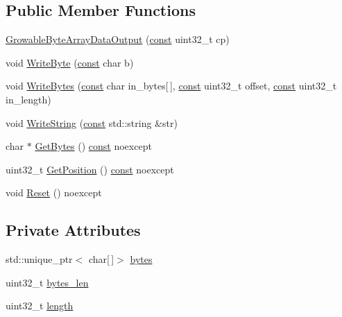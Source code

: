 \subsection*{Public Member Functions}
\begin{DoxyCompactItemize}
\item 
\mbox{\hyperlink{classlucene_1_1core_1_1store_1_1GrowableByteArrayDataOutput_abc6d88640442e04cffc1724dc4762640}{Growable\+Byte\+Array\+Data\+Output}} (\mbox{\hyperlink{ZlibCrc32_8h_a2c212835823e3c54a8ab6d95c652660e}{const}} uint32\+\_\+t cp)
\item 
void \mbox{\hyperlink{classlucene_1_1core_1_1store_1_1GrowableByteArrayDataOutput_acc15bef7c843270e142e935348fa5583}{Write\+Byte}} (\mbox{\hyperlink{ZlibCrc32_8h_a2c212835823e3c54a8ab6d95c652660e}{const}} char b)
\item 
void \mbox{\hyperlink{classlucene_1_1core_1_1store_1_1GrowableByteArrayDataOutput_ade5509d15287b0b7a70a50b8ebad79d1}{Write\+Bytes}} (\mbox{\hyperlink{ZlibCrc32_8h_a2c212835823e3c54a8ab6d95c652660e}{const}} char in\+\_\+bytes\mbox{[}$\,$\mbox{]}, \mbox{\hyperlink{ZlibCrc32_8h_a2c212835823e3c54a8ab6d95c652660e}{const}} uint32\+\_\+t offset, \mbox{\hyperlink{ZlibCrc32_8h_a2c212835823e3c54a8ab6d95c652660e}{const}} uint32\+\_\+t in\+\_\+length)
\item 
void \mbox{\hyperlink{classlucene_1_1core_1_1store_1_1GrowableByteArrayDataOutput_a0824b85acf54d2f2e4d63575ecad6d79}{Write\+String}} (\mbox{\hyperlink{ZlibCrc32_8h_a2c212835823e3c54a8ab6d95c652660e}{const}} std\+::string \&str)
\item 
char $\ast$ \mbox{\hyperlink{classlucene_1_1core_1_1store_1_1GrowableByteArrayDataOutput_a6e758bdc6814dd4dbfaa42cecf2d71e7}{Get\+Bytes}} () \mbox{\hyperlink{ZlibCrc32_8h_a2c212835823e3c54a8ab6d95c652660e}{const}} noexcept
\item 
uint32\+\_\+t \mbox{\hyperlink{classlucene_1_1core_1_1store_1_1GrowableByteArrayDataOutput_acebbce9c2300172c83142f78914e96c1}{Get\+Position}} () \mbox{\hyperlink{ZlibCrc32_8h_a2c212835823e3c54a8ab6d95c652660e}{const}} noexcept
\item 
void \mbox{\hyperlink{classlucene_1_1core_1_1store_1_1GrowableByteArrayDataOutput_a73ab4384f27b38c98afb4f95c3d376de}{Reset}} () noexcept
\end{DoxyCompactItemize}
\subsection*{Private Attributes}
\begin{DoxyCompactItemize}
\item 
std\+::unique\+\_\+ptr$<$ char\mbox{[}$\,$\mbox{]}$>$ \mbox{\hyperlink{classlucene_1_1core_1_1store_1_1GrowableByteArrayDataOutput_a5b20027c028e93d0701fe508a2e2440f}{bytes}}
\item 
uint32\+\_\+t \mbox{\hyperlink{classlucene_1_1core_1_1store_1_1GrowableByteArrayDataOutput_a7e9aaf0e480e39892b9446282ddc3c12}{bytes\+\_\+len}}
\item 
uint32\+\_\+t \mbox{\hyperlink{classlucene_1_1core_1_1store_1_1GrowableByteArrayDataOutput_aaf336b80873254670a7223c7d78c1611}{length}}
\end{DoxyCompactItemize}
